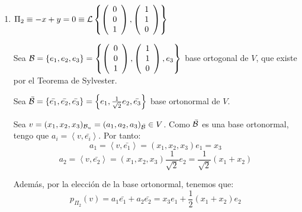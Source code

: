 \begin{ejercicio}
\begin{enumerate}
\begin{enumerate}
        \item $\Pi_2\equiv -x+y=0 \equiv \mathcal{L}\left\{\left(\begin{array}{c}
             0 \\ 0 \\ 1
        \end{array}\right),
        \left(\begin{array}{c}
             1 \\ 1 \\ 0
        \end{array}\right)\right\}$

        Sea $\mathcal{B}=\{e_1, e_2, e_3\}=\left\{
                \left(\begin{array}{c}
                     0 \\ 0 \\ 1
                \end{array}\right),
                \left(\begin{array}{c}
                     1 \\ 1 \\ 0
                \end{array}\right),
                e_3\right\}$
        base ortogonal de $V$, que existe por el Teorema de Sylvester.
        
        Sea $\bar{\mathcal{B}}=\{\bar{e_1}, \bar{e_2}, \bar{e_3}\}= \left\{
            e_1,
            \frac{1}{\sqrt{2}}e_2, \bar{e_3}
            \right\}$ base ortonormal de $V$.
        
        Sea $v=(x_1, x_2, x_3)_{\mathcal{B}_u}=(a_1, a_2, a_3)_{\bar{\mathcal{B}}}\in V$. Como $\bar{\mathcal{B}}$ es una base ortonormal, tengo que $a_i = \left<v, \bar{e_i}\right>$. Por tanto:
        \begin{equation*}
            a_1 = \left<v, \bar{e_1}\right> = (x_1, x_2, x_3) e_1
            = x_3
        \end{equation*}
        \begin{equation*}
            a_2 = \left<v, \bar{e_2}\right> = (x_1, x_2, x_3) \frac{1}{\sqrt{2}} e_2
            = \frac{1}{\sqrt{2}}(x_1 + x_2)
        \end{equation*}
        
        Además, por la elección de la base ortonormal, tenemos que:
        \begin{equation*}
            p_{\Pi_2}(v)=a_1\bar{e_1} +a_2\bar{e_2}= x_3e_1 +\frac{1}{2}(x_1 + x_2)e_2
        \end{equation*}


\end{enumerate}
\end{enumerate}
\end{ejercicio}
